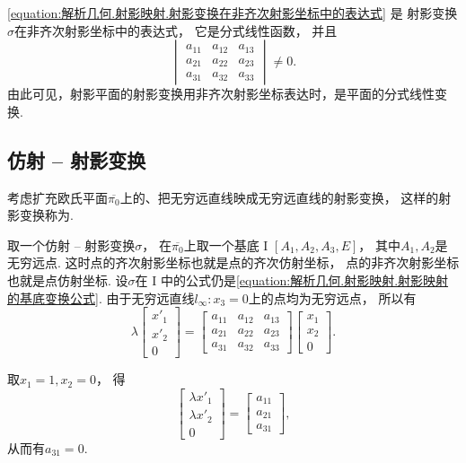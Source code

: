 \cref{equation:解析几何.射影映射.射影变换在非齐次射影坐标中的表达式} 是
射影变换\(\sigma\)在非齐次射影坐标中的表达式，
它是分式线性函数，
并且\begin{equation*}
	\begin{vmatrix}
		a_{11} & a_{12} & a_{13} \\
		a_{21} & a_{22} & a_{23} \\
		a_{31} & a_{32} & a_{33}
	\end{vmatrix}
	\neq 0.
\end{equation*}
由此可见，射影平面的射影变换用非齐次射影坐标表达时，是平面的分式线性变换.

\subsection{仿射 -- 射影变换}
考虑扩充欧氏平面\(\overline{\pi_0}\)上的、把无穷远直线映成无穷远直线的射影变换，
这样的射影变换称为.

取一个仿射 -- 射影变换\(\sigma\)，
在\(\overline{\pi_0}\)上取一个基底 I \([A_1,A_2,A_3,E]\)，
其中\(A_1,A_2\)是无穷远点.
这时点的齐次射影坐标也就是点的齐次仿射坐标，
点的非齐次射影坐标也就是点仿射坐标.
设\(\sigma\)在 I 中的公式仍是\cref{equation:解析几何.射影映射.射影映射的基底变换公式}.
由于无穷远直线\(l_\infty: x_3 = 0\)上的点均为无穷远点，
所以有\begin{equation*}
	\lambda
	\begin{bmatrix}
		x'_1 \\ x'_2 \\ 0
	\end{bmatrix}
	= \begin{bmatrix}
		a_{11} & a_{12} & a_{13} \\
		a_{21} & a_{22} & a_{23} \\
		a_{31} & a_{32} & a_{33}
	\end{bmatrix}
	\begin{bmatrix}
		x_1 \\ x_2 \\ 0
	\end{bmatrix}.
\end{equation*}

取\(
	x_1 = 1,
	x_2 = 0
\)，
得\begin{equation*}
	\begin{bmatrix}
		\lambda x'_1 \\ \lambda x'_2 \\ 0
	\end{bmatrix}
	= \begin{bmatrix}
		a_{11} \\
		a_{21} \\
		a_{31}
	\end{bmatrix},
\end{equation*}
从而有\(a_{31} = 0\).

